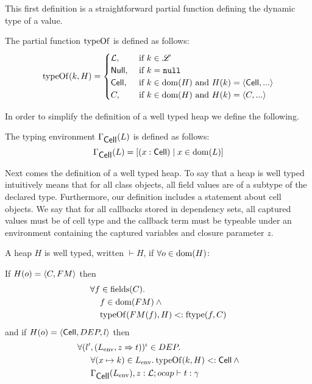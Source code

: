 This first definition is a straightforward partial function defining the dynamic
type of a value.
\begin{definition}
  The partial function $\mbox{$\mathrm{typeOf}$}$ is defined as follows:
  \begin{equation}
    \mbox{$\mathrm{typeOf}$}{(k, H)} =
    \begin{cases}
      \mbox{$\mathcal{L}$}, &\text{ if }k \in \mbox{$\mathscr{L}$} \\
      \mbox{$\mathsf{Null}$}, &\text{ if }k = \mbox{\mdseries\texttt{null}} \\
      \mbox{$\mathsf{Cell}$}, &\text{ if }k \in \mbox{$\mathrm{dom}$}{(H)}\text{ and } H(k) = \mbox{$\langle \mbox{$\mathsf{Cell}$}{}, ... \rangle$} \\
      C, &\text{ if }k \in \mbox{$\mathrm{dom}$}{(H)}\text{ and } H(k) = \mbox{$\langle C, ... \rangle$} \\
    \end{cases}
  \end{equation}
\end{definition}
In order to simplify the definition of a well typed heap we define the
following.
\begin{definition}
  The typing environment $\Gamma_{\mbox{$\mathsf{Cell}$}}(L)$ is defined as follows:
  \begin{equation}
    \Gamma_{\mbox{$\mathsf{Cell}$}}(L) = \left[(x: \mbox{$\mathsf{Cell}$}) \mid x \in \mbox{$\mathrm{dom}$}(L)\right]
  \end{equation}
\end{definition}
Next comes the definition of a well typed heap. To say that a heap is
well typed intuitively means that for all class objects, all field values are of
a subtype of the declared type. Furthermore, our definition includes a statement
about cell objects. We say that for all callbacks stored in dependency sets, all
captured values must be of cell type and the callback term must be typeable
under an environment containing the captured variables and closure parameter
$z$.
\begin{definition}
  A heap $H$ is well typed, written $\vdash{H}$, if
  $\forall o \in \mbox{$\mathrm{dom}$}{(H)}$:

  If $H(o) = \mbox{$\langle C, FM \rangle$}$ then
  \begin{equation} \label{eq:defwth1}
    \begin{aligned}
      \forall f &\in \mbox{$\mathrm{fields}$}{(C)}. \\ 
      &f \in \mbox{$\mathrm{dom}$}{(FM)} \: \land \\ 
      &\mbox{$\mathrm{typeOf}$}{(FM(f), H)} <: \mbox{$\mathrm{ftype}$}{(f, C)}
    \end{aligned}
  \end{equation}
  and if $H(o) = \mbox{$\langle \mbox{$\mathsf{Cell}$}{}, DEP, l \rangle$}$ then
  \begin{equation} \label{eq:defwth2}
    \begin{aligned}
      \forall (l'&, (L_{\text{env}}, z \Rightarrow t))^\iota \in DEP. \\
      &\forall (x \mapsto k) \in L_{\text{env}}.\: \mbox{$\mathrm{typeOf}$}{(k, H)} <:
      \mbox{$\mathsf{Cell}$} \: \land \\
      &\mbox{$\Gamma_{\mbox{$\mathsf{Cell}$}{}}(L_{\text{env}}), z:
      \mbox{$\mathcal{L}$};\mbox{$ocap$}\vdash t:\gamma$} 
    \end{aligned}
  \end{equation}
\end{definition}

